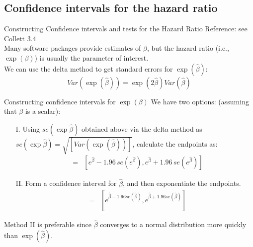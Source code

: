 \documentclass[envcountsect, 10pt, portrait, palatino]{beamer}
\begin{document}
\subsection{Confidence intervals for the hazard ratio}
\begin{frame}{Constructing Confidence intervals and tests for the Hazard Ratio}
Reference: see Collett 3.4
\\[1ex]

Many software packages provide estimates of $\beta$, but
the hazard ratio (i.e., $\exp(\beta)$) is usually the parameter of
interest.
\\[2ex]
We can use the delta method to get standard errors
for $\exp(\hat{\beta})$:\\
\[Var(\exp(\hat{\beta}))=\exp(2\hat{\beta}) Var(\hat{\beta})\]
\end{frame}
\begin{frame}{Constructing confidence intervals for $\exp(\beta)$}
We have two options: (assuming that $\beta$ is a scalar):
\begin{itemize}
\item[I.] Using $se(\exp{\hat\beta})$ obtained above via the delta method
as $se(\exp{\hat\beta})=\sqrt{[Var(\exp(\hat{\beta}))]}$, calculate
the endpoints as:
\begin{eqnarray*}
[L,U] & = & [e^{\hat\beta} - 1.96 \, se(e^{\hat\beta}),
e^{\hat\beta} + 1.96 \, se(e^{\hat\beta})]
\end{eqnarray*}

\item[II.] Form a confidence interval for $\hat{\beta}$, and then
exponentiate the endpoints.
\begin{eqnarray*}
[L,U] & = & [e^{\hat\beta - 1.96 se(\hat\beta)},
e^{\hat\beta + 1.96 se(\hat\beta)}]
\end{eqnarray*}
\end{itemize}

Method II is preferable since $\hat{\beta}$ converges to a normal
distribution more quickly than $\exp(\hat{\beta})$.
\end{frame}
\end{document}
